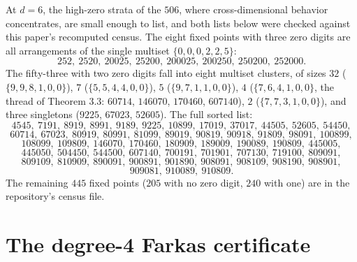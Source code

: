 \documentclass[11pt,letterpaper]{article}
\theoremstyle{paperstyle}
\theoremstyle{paperstyledef}
\theoremstyle{paperstylerem}
\begin{document}
At \(d = 6\), the high-zero strata of the \(506\), where cross-dimensional behavior concentrates, are small enough to list, and both lists below were checked against this paper's recomputed census. The eight fixed points with three zero digits are all arrangements of the single multiset \(\{0,0,0,2,2,5\}\): \[252,\ 2520,\ 20025,\ 25200,\ 200025,\ 200250,\ 250200,\ 252000.\] The fifty-three with two zero digits fall into eight multiset clusters, of sizes \(32\) (\(\{9,9,8,1,0,0\}\)), \(7\) (\(\{5,5,4,4,0,0\}\)), \(5\) (\(\{9,7,1,1,0,0\}\)), \(4\) (\(\{7,6,4,1,0,0\}\), the thread of Theorem 3.3: \(60714\), \(146070\), \(170460\), \(607140\)), \(2\) (\(\{7,7,3,1,0,0\}\)), and three singletons (\(9225\), \(67023\), \(52605\)). The full sorted list: \[4545,\ 7191,\ 8919,\ 8991,\ 9189,\ 9225,\ 10899,\ 17019,\ 37017,\ 44505,\ 52605,\ 54450,\] \[60714,\ 67023,\ 80919,\ 80991,\ 81099,\ 89019,\ 90819,\ 90918,\ 91809,\ 98091,\ 100899,\] \[108099,\ 109809,\ 146070,\ 170460,\ 180909,\ 189009,\ 190089,\ 190809,\ 445005,\] \[445050,\ 504450,\ 544500,\ 607140,\ 700191,\ 701901,\ 707130,\ 719100,\ 809091,\] \[809109,\ 810909,\ 890091,\ 900891,\ 901890,\ 908091,\ 908109,\ 908190,\ 908901,\] \[909081,\ 910089,\ 910809.\] The remaining \(445\) fixed points (\(205\) with no zero digit, \(240\) with one) are in the repository's census file.

\section{The degree-4 Farkas certificate}\label{the-degree-4-farkas-certificate}
\end{document}
